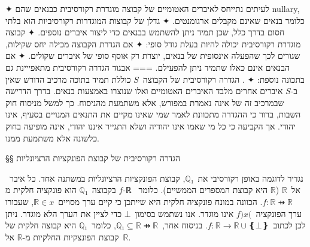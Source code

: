 ✦ לעיתים נתייחס לאיברים האטומיים של קבוצה מוגדרת רקורסיבית כבנאים שהם nullary,
כלומר בנאים שאינם מקבלים ארגומנטים.
✦ גדלן של קבוצות המוגדרות רקורסיביות הוא בלתי חסום בדרך כלל, שכן תמיד ניתן
להשתמש בבנאים כדי ליצור איברים נוספים.
✦ קבוצה מוגדרת רקורסיבית יכולה להיות בעלת גודל סופי:
✦ אם הגדרת הקבוצה מכילה יחס שקילות, שגורים לכך שהפעלה אינסופית של בנאים, יוצרת
רק אוסף סופי של איברים שקולים.
✦ אם הבנאים אינם כאלו שתמיד ניתן להפעילם.
===
{אבגוד}
הגדרה רקורסיבית מתאפייינת גם בתכונה נוספת:
✦ . הגדרה רקורסיבית של הקבוצה~$S$ כוללת תמיד בתוכה מרכיב
הדורש שאין ב-$S$ איברים אחרים מלבד האיברים האטומיים ואלו שנוצרו באמצעות בנאים.
בדרך הדרישה שבמרכיב זה של אינה נאמרת במפורש, אלא משתמעת מהניסוח. כך למשל מניסוח
חוק השבות, ברור כי ההגדרה מתכוונת לאמר שמי שאינו מקיים את התנאים המנויים בסעיף,
אינו יהודי. אך הקביעה כי כל מי שאמו אינו יהודיה ושלא התגייר איננו יהודי, אינה
מופיעה בחוק כלשונה אלא משתמעת ממנו.

§§ הגדרה רקורסיבית של קבוצת הפונקציות הרציונליות

נגדיר לדוגמה באופן רקורסיבי את~$ℚ₁$, קבוצת הפונקציות הרציונליות במשתנה אחד. כל
איבר~$f$ בקבוצה~$ℚ₁$ הוא פונקציה חלקית מ-ℝ אל~$ℝ$ ($ℝ$ היא קבוצת
המספרים הממשיים). כלומר~$f:ℝ⇸ℝ$. הכוונה במונח פונקציה חלקית היא שייתכן כי קיים
ערך מסויים~$ℝ∈x$, שעבורו ערך הפונקציה~$f)x($ אינו
מוגדר. אנו נשתמש בסימון~$⊥$ כדי לציין את הערך הלא מוגדר. ניתן לכן
לכתוב~$f:ℝ→ℝ∪❴⊥❵$. בניסוח אחר,~$ℚ₁⊆ℝ⇸ℝ$, כלומר~$ℚ₁$ היא קבוצה חלקית של קבוצת
הפונצקיות החלקיות מ-$ℝ$ אל~$ℝ$.

